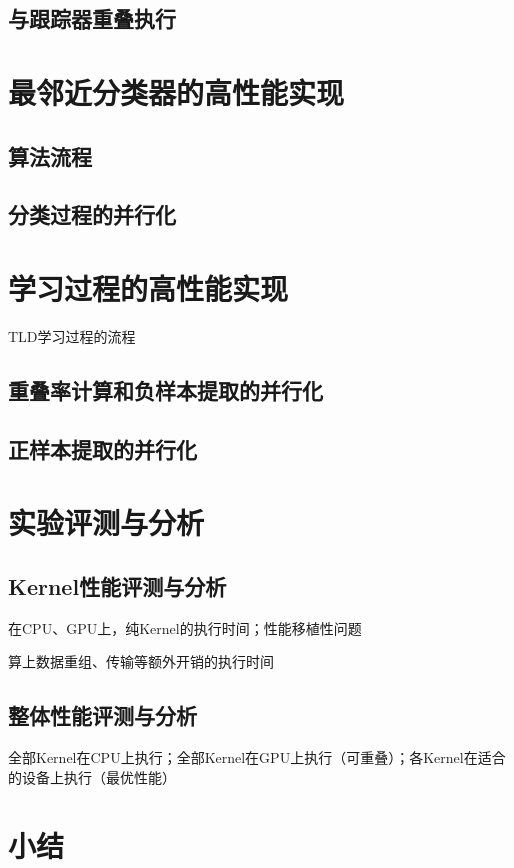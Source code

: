 \subsection{与跟踪器重叠执行}

\section{最邻近分类器的高性能实现}
\subsection{算法流程}
\subsection{分类过程的并行化}

\section{学习过程的高性能实现}
TLD学习过程的流程
\subsection{重叠率计算和负样本提取的并行化}
\subsection{正样本提取的并行化}

\section{实验评测与分析}
\subsection{Kernel性能评测与分析}
在CPU、GPU上，纯Kernel的执行时间；性能移植性问题

算上数据重组、传输等额外开销的执行时间

\subsection{整体性能评测与分析}
全部Kernel在CPU上执行；全部Kernel在GPU上执行（可重叠）；各Kernel在适合的设备上执行（最优性能）

\section{小结}